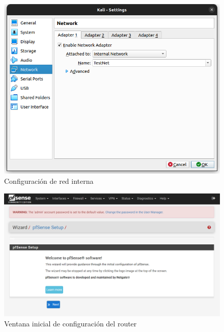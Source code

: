 \documentclass{article}
\begin{document}
        \begin{figure}[!htbp]
            \centering
            \includegraphics[scale=0.25]{img/all-internal.png}
            \caption{Configuración de red interna}
            \label{fig:all-internal}
        \end{figure}

        \begin{figure}[!htbp]
            \centering
            \includegraphics[scale=0.3]{img/pfsense-config-init.png}
            \caption{Ventana inicial de configuración del router}
            \label{fig:pfsense-config-init}
        \end{figure}
\end{document}
